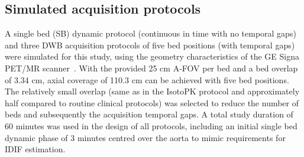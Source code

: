\subsection{Simulated acquisition protocols}
A single bed (SB) dynamic protocol (continuous in time with no temporal gaps) and three DWB acquisition protocols of five bed positions (with temporal gaps) were simulated for this study, using the geometry characteristics of the GE Signa PET/MR scanner~\cite{Grant2016}. With the provided 25 cm A-FOV per bed and a bed overlap of 3.34 cm, axial coverage of 110.3 cm can be achieved with five bed positions. The relatively small overlap (same as in the IsotoPK protocol and approximately half compared to routine clinical protocols) was selected to reduce the number of beds and subsequently the acquisition temporal gaps.
A total study duration of 60 minutes was used in the design of all protocols, including an initial single bed dynamic phase of 3 minutes centred over the aorta to mimic requirements for IDIF estimation.

